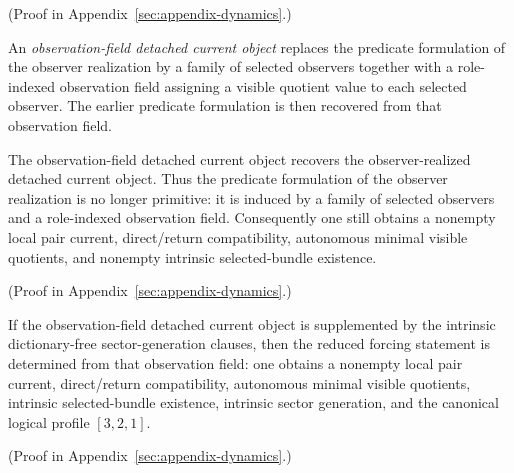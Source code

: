 (Proof in Appendix~\ref{sec:appendix-dynamics}.)

\begin{definition}
\label{def:observation-field-detached-current-object}
An \emph{observation-field detached current object} replaces the predicate
formulation of the observer realization by a family of selected observers
together with a role-indexed observation field assigning a visible quotient
value to each selected observer. The earlier predicate formulation is then
recovered from that observation field.
\end{definition}

\begin{theorem}
\label{thm:observation-field-detached-current-object-recovers-the-observer-realized-surface}
The observation-field detached current object recovers the observer-realized
detached current object. Thus the predicate formulation of the observer
realization is no longer primitive: it is induced by a family of selected
observers and a role-indexed observation field. Consequently one still
obtains a nonempty local pair current, direct/return compatibility,
autonomous minimal visible quotients, and nonempty intrinsic selected-bundle
existence.
\end{theorem}

(Proof in Appendix~\ref{sec:appendix-dynamics}.)

\begin{corollary}
\label{cor:observation-field-detached-current-sector-object-closes-the-reduced-seam}
If the observation-field detached current object is supplemented by the
intrinsic dictionary-free sector-generation clauses, then the reduced forcing
statement is determined from that observation field: one obtains a nonempty
local pair current, direct/return compatibility, autonomous minimal visible
quotients, intrinsic selected-bundle existence, intrinsic sector generation,
and the canonical logical profile \([3,2,1]\).
\end{corollary}

(Proof in Appendix~\ref{sec:appendix-dynamics}.)

